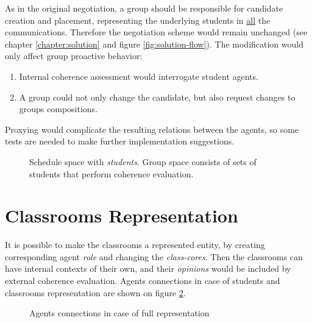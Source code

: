 \documentclass[header]{subfiles}
\providecommand{\rootdir}{.}
\begin{document}
As in the original negotiation, a group should be responsible for candidate
creation and placement, representing the underlying students in \underline{all}
the communications. Therefore the negotiation scheme would remain unchanged
(see chapter \ref{chapter:solution} and figure \ref{fig:solution-flow}).
The modification would only affect group proactive behavior:
\begin{enumerate}
  \item Internal coherence assessment would interrogate student agents.
  \item A group could not only change the candidate, but also request changes
        to groups compositions.
\end{enumerate}

\medskip\noindent
Proxying would complicate the resulting relations between the agents, so
some tests are needed to make further implementation suggestions.


\begin{figure}[H]
  \centering
  \resizebox{\textwidth}{!}{
    
  }
  \caption[Schedule space with students]
          {Schedule space with \emph{students}. Group space consists of
           sets of students that perform coherence evaluation. }
  \label{fig:ScheduleHypercube-S}
\end{figure}

\section{Classrooms Representation}
It is possible to make the classrooms a represented entity, by creating
corresponding agent \emph{role} and changing the \emph{class-cores}.
Then the classrooms can have internal contexts of their own, and their
\emph{opinions} would be included by external coherence evaluation.
Agents connections in case of students and classrooms representation are shown
on figure \ref{fig:ConnectionMatrixAll}.
\begin{figure}[H]
  \resizebox{\textwidth}{!}{
    
  }
  \caption{Agents connections in case of full representation}
  \label{fig:ConnectionMatrixAll}
\end{figure}
\end{document}
